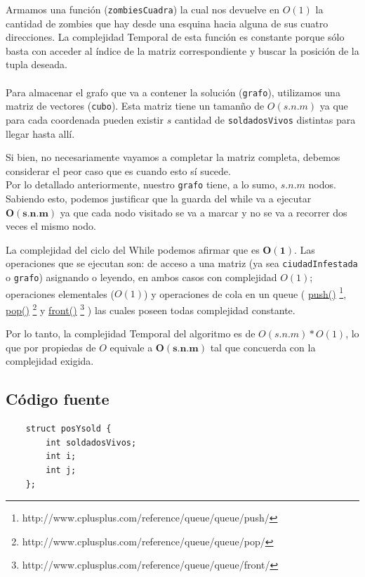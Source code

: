 Armamos una funci\'on (\texttt{zombiesCuadra}) la cual nos devuelve en $O(1)$ la cantidad de zombies que hay desde una esquina hacia alguna de sus cuatro direcciones. La complejidad Temporal de esta funci\'on es constante porque s\'olo basta con acceder al \'indice de la matriz correspondiente y buscar la posici\'on de la tupla deseada.\\
\\

Para almacenar el grafo que va a contener la soluci\'on (\texttt{grafo}), utilizamos una matriz de vectores (\texttt{cubo}). Esta matriz tiene un taman\~no de $O(s.n.m)$ ya que para cada coordenada pueden existir $s$ cantidad de \texttt{soldadosVivos} distintas para llegar hasta all\'i.

Si bien, no necesariamente vayamos a completar la matriz completa, debemos considerar el peor caso que es cuando esto s\'i sucede.\\

Por lo detallado anteriormente, nuestro \texttt{grafo} tiene, a lo sumo, $s.n.m$ nodos. Sabiendo esto, podemos justificar que la guarda del while va a ejecutar  $\mathbf{O(s.n.m)}$ ya que cada nodo visitado se va a marcar y no se va a recorrer dos veces el mismo nodo.

La complejidad del ciclo del While podemos afirmar que es $\mathbf{O(1)}$. Las operaciones que se ejecutan son: de acceso a una matriz (ya sea \texttt{ciudadInfestada} o \texttt{grafo}) asignando o leyendo, en ambos casos con complejidad $O(1)$; operaciones elementales ($O(1)$) y operaciones de cola en un queue (
\href{http://www.cplusplus.com/reference/queue/queue/push/}{push()} \footnote{http://www.cplusplus.com/reference/queue/queue/push/}, 
\href{http://www.cplusplus.com/reference/queue/queue/pop/}{pop()} \footnote{http://www.cplusplus.com/reference/queue/queue/pop/} y 
\href{http://www.cplusplus.com/reference/queue/queue/front/}{front()} \footnote{http://www.cplusplus.com/reference/queue/queue/front/}
) las cuales poseen todas complejidad constante.\\

\bigskip

Por lo tanto, la complejidad Temporal del algoritmo es de $O(s.n.m)*O(1)$, lo que por propiedas de $O$ equivale a $\mathbf{O(s.n.m)}$ tal que concuerda con la complejidad exigida.

\newpage

\subsection{C\'odigo fuente}
	\begin{codesnippet}
	\begin{verbatim}
    struct posYsold {
        int soldadosVivos;
        int i;
        int j;
    };
	\end{verbatim}
	\end{codesnippet}

